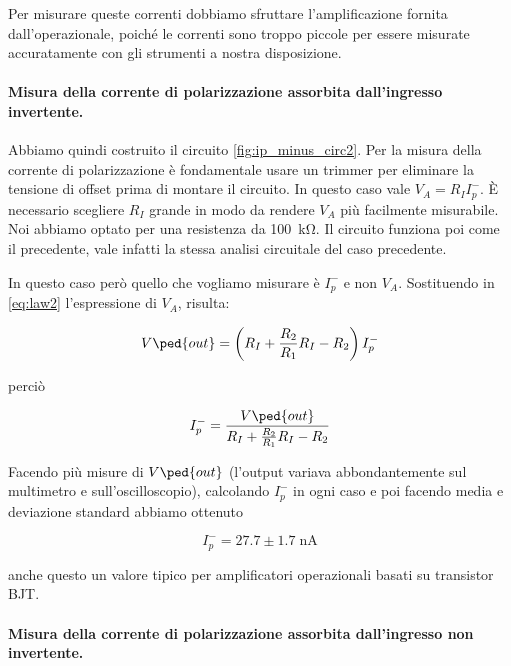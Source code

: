 Per misurare queste correnti dobbiamo sfruttare l'amplificazione fornita dall'operazionale, poiché
le correnti sono troppo piccole per essere misurate accuratamente con gli strumenti a nostra disposizione.

\paragraph{Misura della corrente di polarizzazione assorbita dall'ingresso invertente.}

Abbiamo quindi costruito il circuito \ref{fig:ip_minus_circ2}. Per la misura della corrente di polarizzazione
è fondamentale usare un trimmer per eliminare la tensione di offset prima di montare il circuito.
In questo caso vale $V_A = R_I I_p^-$. È necessario scegliere $R_I$ grande in modo da rendere $V_A$ più facilmente
misurabile. Noi abbiamo optato per una resistenza da \SI{100}{\kilo\ohm}. Il circuito funziona poi come il
precedente, vale infatti la stessa analisi circuitale del caso precedente.

In questo caso però quello che vogliamo misurare è $I_p^-$ e non $V_A$. Sostituendo in \eqref{eq:law2}
l'espressione di $V_A$, risulta:

\begin{equation}
    V\ped{out} = \left( R_I + \frac{R_2}{R_1} R_I - R_2 \right) I_p^-
\end{equation}

perciò

\begin{equation}
    I_p^- = \frac{V\ped{out}}{ R_I + \frac{R_2}{R_1} R_I - R_2}
\end{equation}

Facendo più misure di $V\ped{out}$ (l'output variava abbondantemente sul multimetro e sull'oscilloscopio),
calcolando $I_p^-$ in ogni caso e poi facendo media e deviazione standard abbiamo ottenuto

\begin{equation}
    I_p^- = 27.7 \pm 1.7 \; \si{\nano\ampere}
\end{equation}

anche questo un valore tipico per amplificatori operazionali basati su transistor BJT.

\paragraph{Misura della corrente di polarizzazione assorbita dall'ingresso non invertente.}

